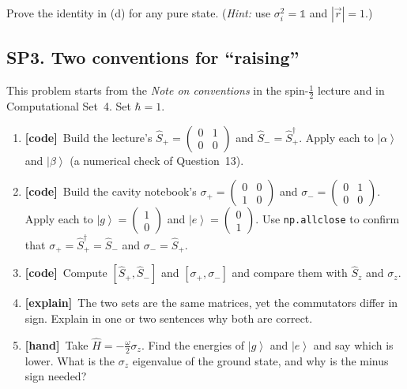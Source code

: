 \documentclass[11pt]{article}
\newif\ifsolutions
\newcommand{\tagbox}[2]{\textcolor{#1}{\textsf{\textbf{[#2]}}}}
\newcommand{\hand}{\tagbox{handc}{hand}}
\newcommand{\code}{\tagbox{codec}{code}}
\newcommand{\expl}{\tagbox{explc}{explain}}
\newcommand{\ans}[1]{\ifsolutions\par\noindent\hspace*{1.5em}\textcolor{ansc}{\small\textit{Answer:} #1}\fi}
\newcommand{\ket}[1]{\left|#1\right\rangle}
\newcommand{\Sop}{\hat{S}}
\newcommand{\Hop}{\hat{H}}
\newcommand{\one}{\mathbb{1}}
\newcommand{\cvec}[2]{\begin{pmatrix}#1\\#2\end{pmatrix}}
\newcommand{\mat}[4]{\begin{pmatrix}#1 & #2\\ #3 & #4\end{pmatrix}}
\newcommand{\py}[1]{\texttt{#1}}
\begin{document}
\begin{gradext}
Prove the identity in (d) for any pure state. (\emph{Hint:} use $\sigma_i^2 = \one$ and $|\vec r| = 1$.)
\end{gradext}

\subsection*{SP3. Two conventions for ``raising''}

This problem starts from the \emph{Note on conventions} in the spin-$\tfrac12$ lecture and in Computational Set~4.
Set $\hbar = 1$.

\begin{enumerate}
\item \code\ Build the lecture's $\Sop_+ = \mat{0}{1}{0}{0}$ and $\Sop_- = \Sop_+^\dagger$.
Apply each to $\ket\alpha$ and $\ket\beta$ (a numerical check of Question~13).

\item \code\ Build the cavity notebook's $\sigma_+ = \mat{0}{0}{1}{0}$ and $\sigma_- = \mat{0}{1}{0}{0}$.
Apply each to $\ket g = \cvec10$ and $\ket e = \cvec01$.
Use \py{np.allclose} to confirm that $\sigma_+ = \Sop_+^\dagger = \Sop_-$ and $\sigma_- = \Sop_+$.

\item \code\ Compute $[\Sop_+, \Sop_-]$ and $[\sigma_+, \sigma_-]$ and compare them with $\Sop_z$ and $\sigma_z$.
\ans{$[\Sop_+,\Sop_-] = 2\Sop_z$; $\ [\sigma_+,\sigma_-] = -\sigma_z$.}

\item \expl\ The two sets are the same matrices, yet the commutators differ in sign. Explain in one or two sentences why both are correct.
\ans{The cavity $\sigma_\pm$ are the lecture's $\Sop_\mp$ with the names swapped, so $[\sigma_+,\sigma_-] = [\Sop_-,\Sop_+] = -2\Sop_z = -\sigma_z$. ``Raising'' means raising $m_s$ in one convention and raising the energy in the other.}

\item \hand\ Take $\Hop = -\tfrac{\omega}{2}\sigma_z$. Find the energies of $\ket g$ and $\ket e$ and say which is lower.
What is the $\sigma_z$ eigenvalue of the ground state, and why is the minus sign needed?
\ans{$E_g = -\omega/2$, $E_e = +\omega/2$. The ground state has $\sigma_z = +1$; without the minus sign $\ket g$ would be the higher-energy state.}


\end{enumerate}
\end{document}

